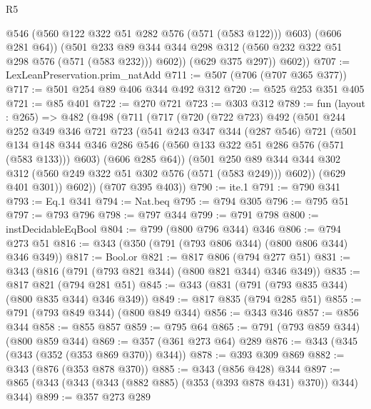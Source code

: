\begin{lexlean}{R5}
\begin{coremodule}
                @546
                (@560 @122 @322 @51 @282 @576 (@571 (@583 @122)))
                @603)
              (@606 @281 @64))
            (@501
              @233
              @89
              @344
              @344
              @298
              @312
              (@560 @232 @322 @51 @298 @576 (@571 (@583 @232)))
              @602))
          (@629 @375 @297))
        @602))
@707 := LexLeanPreservation.prim_natAdd
@711 := @507 (@706 (@707 @365 @377))
@717 := @501 @254 @89 @406 @344 @492 @312
@720 := @525 @253 @351 @405
@721 := @85 @401
@722 := @270 @721
@723 := @303 @312
@789 := fun (layout : @265) =>
  @482
    (@498
      (@711
        (@717
          (@720
            (@722 @723)
            @492
            (@501
              @244
              @252
              @349
              @346
              @721
              @723
              (@541
                @243
                @347
                @344
                (@287 @546)
                @721
                (@501
                  @134
                  @148
                  @344
                  @346
                  @286
                  @546
                  (@560 @133 @322 @51 @286 @576 (@571 (@583 @133)))
                  @603)
                (@606 @285 @64))
              (@501
                @250
                @89
                @344
                @344
                @302
                @312
                (@560 @249 @322 @51 @302 @576 (@571 (@583 @249)))
                @602))
            (@629 @401 @301))
          @602))
      (@707 @395 @403))
@790 := ite.{1}
@791 := @790 @341
@793 := Eq.{1} @341
@794 := Nat.beq
@795 := @794 @305
@796 := @795 @51
@797 := @793 @796
@798 := @797 @344
@799 := @791 @798
@800 := instDecidableEqBool
@804 := @799 (@800 @796 @344) @346
@806 := @794 @273 @51
@816 := @343 (@350 (@791 (@793 @806 @344) (@800 @806 @344) @346 @349))
@817 := Bool.or
@821 := @817 @806 (@794 @277 @51)
@831 := @343 (@816 (@791 (@793 @821 @344) (@800 @821 @344) @346 @349))
@835 := @817 @821 (@794 @281 @51)
@845 := @343 (@831 (@791 (@793 @835 @344) (@800 @835 @344) @346 @349))
@849 := @817 @835 (@794 @285 @51)
@855 := @791 (@793 @849 @344) (@800 @849 @344)
@856 := @343 @346
@857 := @856 @344
@858 := @855 @857
@859 := @795 @64
@865 := @791 (@793 @859 @344) (@800 @859 @344)
@869 := @357 (@361 @273 @64) @289
@876 := @343 (@345 (@343 (@352 (@353 @869 @370)) @344))
@878 := @393 @309 @869
@882 := @343 (@876 (@353 @878 @370))
@885 := @343 (@856 @428) @344
@897 := @865 (@343 (@343 (@343 (@882 @885) (@353 (@393 @878 @431) @370)) @344) @344)
@899 := @357 @273 @289

\end{coremodule}
\end{lexlean}
